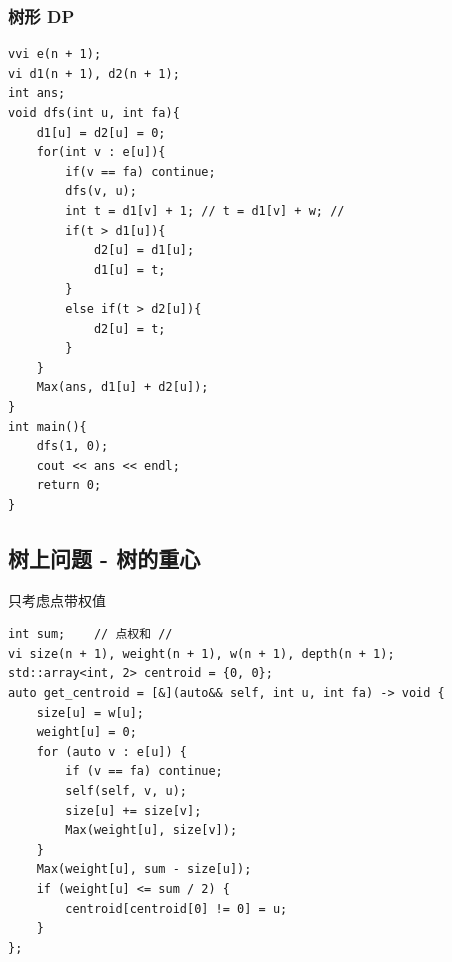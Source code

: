 \documentclass[UTF8, a4paper, titlepage, twoside]{ctexart}
\begin{document}
\subsubsection{ 树形 DP }
\begin{lstlisting}[style=cpp]
vvi e(n + 1);
vi d1(n + 1), d2(n + 1);
int ans;
void dfs(int u, int fa){
    d1[u] = d2[u] = 0;
    for(int v : e[u]){
        if(v == fa) continue;
        dfs(v, u);
        int t = d1[v] + 1; // t = d1[v] + w; //
        if(t > d1[u]){
            d2[u] = d1[u];
            d1[u] = t;
        }
        else if(t > d2[u]){
            d2[u] = t;
        }
    }
    Max(ans, d1[u] + d2[u]);
}
int main(){
    dfs(1, 0);
    cout << ans << endl;
    return 0;
}
\end{lstlisting}

\subsection{ 树上问题 - 树的重心 }
只考虑点带权值
\begin{lstlisting}[style=cpp]
int sum;    // 点权和 //
vi size(n + 1), weight(n + 1), w(n + 1), depth(n + 1);
std::array<int, 2> centroid = {0, 0};
auto get_centroid = [&](auto&& self, int u, int fa) -> void {
    size[u] = w[u];
    weight[u] = 0;
    for (auto v : e[u]) {
        if (v == fa) continue;
        self(self, v, u);
        size[u] += size[v];
        Max(weight[u], size[v]);
    }
    Max(weight[u], sum - size[u]);
    if (weight[u] <= sum / 2) {
        centroid[centroid[0] != 0] = u;
    }
};
\end{lstlisting}
\end{document}
